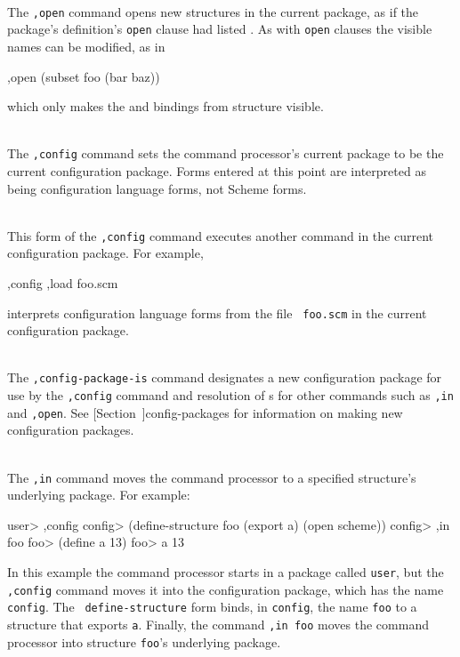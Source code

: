 \begin{description}
\item {} \\
    The {\tt,open} command opens new structures in the current
    package, as if the package's definition's {\tt open} clause
    had listed .
    As with {\tt open} clauses the visible names can be modified,
    as in
\begin{example}
,open (subset foo (bar baz))
\end{example}
    which only makes the  and  bindings from
    structure  visible.

\item {} \\
    The {\tt,config} command sets the command processor's current
    package to be the current configuration package.  Forms entered at
    this point are interpreted as being configuration language forms,
    not Scheme forms.

\item {} \\
    This form of the {\tt,config} command executes another command in
    the current configuration package.  For example,
\begin{example}
,config ,load foo.scm
\end{example}
    interprets configuration language forms from the file {\tt
    foo.scm} in the current configuration package.

\item {} \\
    The {\tt,config-package-is} command designates a new configuration
    package for use by the {\tt,config} command and resolution of
    s for other commands such as {\tt,in} and
    {\tt,open}.  See
    [Section~\Ref]{config-packages}
    for information on making new configuration packages.

\item {} \\
    The {\tt ,in} command moves the command processor to a specified
    structure's underlying package.  For example:
\begin{example}
user> ,config
config> (define-structure foo (export a)
          (open scheme))
config> ,in foo
foo> (define a 13)
foo> a
13
\end{example}
    In this example the command processor starts in a package called
    {\tt user}, but the {\tt ,config} command moves it into the
    configuration package, which has the name {\tt config}.  The {\tt
    define-structure} form binds, in {\tt config}, the name {\tt foo} to
    a structure that exports {\tt a}.  Finally, the command {\tt ,in
    foo} moves the command processor into structure {\tt foo}'s
    underlying package.


\end{description}
